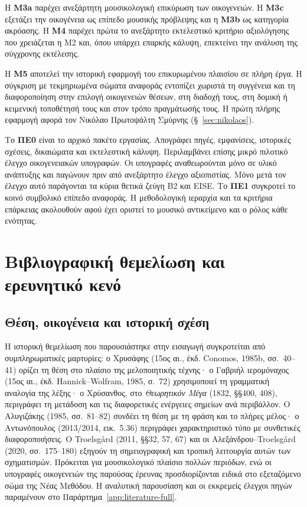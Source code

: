 \documentclass[11pt,a4paper]{article}
\begin{document}
Η \textbf{M3a} παρέχει ανεξάρτητη μουσικολογική επικύρωση των οικογενειών. Η \textbf{M3c} εξετάζει την οικογένεια ως επίπεδο μουσικής πρόβλεψης και η \textbf{M3b} ως κατηγορία ακρόασης. Η \textbf{M4} παρέχει πρώτα το ανεξάρτητο εκτελεστικό κριτήριο αξιολόγησης που χρειάζεται η M2 και, όπου υπάρχει επαρκής κάλυψη, επεκτείνει την ανάλυση της σύγχρονης εκτέλεσης.

Η \textbf{M5} αποτελεί την ιστορική εφαρμογή του επικυρωμένου πλαισίου σε πλήρη έργα. Η σύγκριση με τεκμηριωμένα σώματα αναφοράς εντοπίζει χωριστά τη συγγένεια και τη διαφοροποίηση στην επιλογή οικογενειών θέσεων, στη διαδοχή τους, στη δομική ή κειμενική τοποθέτησή τους και στον τρόπο πραγμάτωσής τους. Η πρώτη πλήρης εφαρμογή αφορά τον Νικόλαο Πρωτοψάλτη Σμύρνης (§~\ref{sec:nikolaos}).

Το \textbf{ΠΕ0} είναι το αρχικό πακέτο εργασίας. Απογράφει πηγές, εμφανίσεις, ιστορικές σχέσεις, δικαιώματα και εκτελεστική κάλυψη. Περιλαμβάνει επίσης μικρό πιλοτικό έλεγχο οικογενειακών υπογραφών. Οι υπογραφές αναθεωρούνται μόνο σε υλικό ανάπτυξης και παγώνουν πριν από ανεξάρτητο έλεγχο αξιοπιστίας. Μόνο μετά τον έλεγχο αυτό παράγονται τα κύρια θετικά ζεύγη B2 και EISE. Το \textbf{ΠΕ1} συγκροτεί το κοινό συμβολικό επίπεδο αναφοράς. Η μεθοδολογική ιεραρχία και τα κριτήρια επάρκειας ακολουθούν αφού έχει οριστεί το μουσικό αντικείμενο και ο ρόλος κάθε ενότητας.

\section{Βιβλιογραφική θεμελίωση και ερευνητικό κενό}
\subsection{Θέση, οικογένεια και ιστορική σχέση}

Η ιστορική θεμελίωση που παρουσιάστηκε στην εισαγωγή συγκροτείται από συμπληρωματικές μαρτυρίες: ο Χρυσάφης (15ος αι., έκδ. Conomos, 1985b, σσ.~40--41) ορίζει τη θέση στο πλαίσιο της μελοποιητικής τέχνης· ο Γαβριήλ ιερομόναχος (15ος αι., έκδ. Hannick--Wolfram, 1985, σ.~72) χρησιμοποιεί τη γραμματική αναλογία της λέξης· ο Χρύσανθος, στο \emph{Θεωρητικόν Μέγα} (1832, §§400, 408), περιγράφει τη μετάδοση και τις διαφορετικές ενέργειες σημείων ανά περιβάλλον. Ο Αλυγιζάκης (1985, σσ.~81--82) συνδέει τη θέση με τη φράση και το πλήρες μέλος· ο Αντωνόπουλος (2013/2014, εικ.~5.36) περιγράφει χαρακτηριστικό τύπο με συνθετικές διαφοροποιήσεις. Ο Troelsgård (2011, §§32, 57, 67) και οι Αλεξάνδρου--Troelsgård (2020, σσ.~175--180) εξηγούν τη σημειογραφική και τροπική λειτουργία αυτών των σχηματισμών. Πρόκειται για μουσικολογικό πλαίσιο πολλών περιόδων, ενώ οι υπογραφές οικογενειών της παρούσας έρευνας προσδιορίζονται ειδικά στο εξεταζόμενο σώμα της Νέας Μεθόδου. Η αναλυτική παρουσίαση και οι εκκρεμείς έλεγχοι πηγών παραμένουν στο Παράρτημα~\ref{app:literature-full}.
\end{document}
